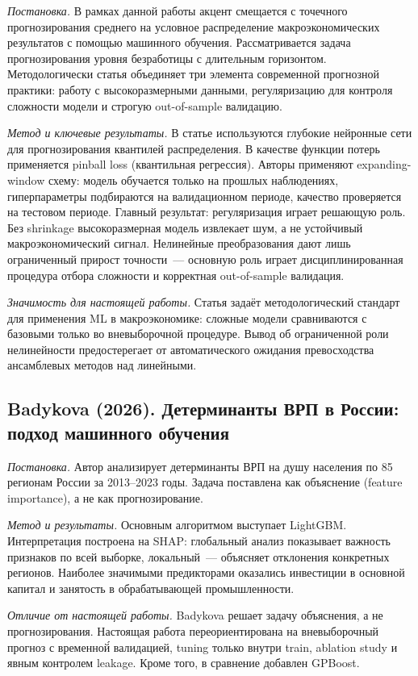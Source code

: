 \documentclass[12pt,a4paper]{article}
\begin{document}
\textit{Постановка.} В рамках данной работы акцент смещается с точечного
прогнозирования среднего на условное распределение макроэкономических
результатов с помощью машинного обучения. Рассматривается задача
прогнозирования уровня безработицы с длительным горизонтом. Методологически
статья объединяет три элемента современной прогнозной практики: работу с
высокоразмерными данными, регуляризацию для контроля сложности модели и
строгую out-of-sample валидацию.

\textit{Метод и ключевые результаты.} В статье используются глубокие
нейронные сети для прогнозирования квантилей распределения. В качестве
функции потерь применяется pinball loss (квантильная регрессия). Авторы
применяют expanding-window схему: модель обучается только на прошлых
наблюдениях, гиперпараметры подбираются на валидационном периоде, качество
проверяется на тестовом периоде. Главный результат: регуляризация играет
решающую роль. Без shrinkage высокоразмерная модель извлекает шум, а не
устойчивый макроэкономический сигнал. Нелинейные преобразования дают лишь
ограниченный прирост точности~--- основную роль играет дисциплинированная
процедура отбора сложности и корректная out-of-sample валидация.

\textit{Значимость для настоящей работы.} Статья задаёт методологический
стандарт для применения ML в макроэкономике: сложные модели сравниваются
с базовыми только во вневыборочной процедуре. Вывод об ограниченной роли
нелинейности предостерегает от автоматического ожидания превосходства
ансамблевых методов над линейными.

\subsection{Badykova (2026). Детерминанты ВРП в России:
подход машинного обучения~\cite{badykova2026}}

\textit{Постановка.} Автор анализирует детерминанты ВРП на душу населения
по 85 регионам России за 2013--2023 годы. Задача поставлена как объяснение
(feature importance), а не как прогнозирование.

\textit{Метод и результаты.} Основным алгоритмом выступает LightGBM.
Интерпретация построена на SHAP: глобальный анализ показывает важность
признаков по всей выборке, локальный~--- объясняет отклонения конкретных
регионов. Наиболее значимыми предикторами оказались инвестиции в основной
капитал и занятость в обрабатывающей промышленности.

\textit{Отличие от настоящей работы.} Badykova решает задачу объяснения,
а не прогнозирования. Настоящая работа переориентирована на вневыборочный
прогноз с временно\'{й} валидацией, tuning только внутри train, ablation
study и явным контролем leakage. Кроме того, в сравнение добавлен GPBoost.
\end{document}
